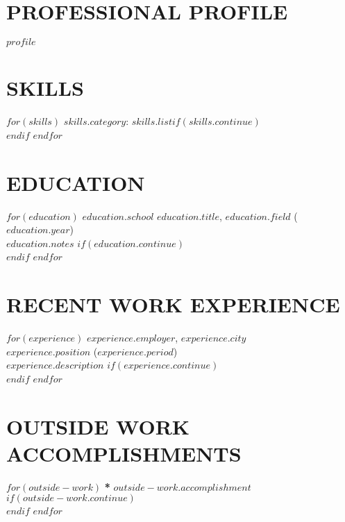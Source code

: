\documentclass[a4paper, line, 11pt]{res} %
\begin{document}
 
 
\address{$if(contact.address)$$contact.address$\\$endif$$if(contact.telephone)$Tel: $contact.telephone$$endif$}        
\address{$if(contact.email)$E-mail: $contact.email$$endif$$if(contact.url)$\\ URL: $contact.url$$endif$$if(contact.extra)$$contact.extra$$endif$}
  
                        
\begin{resume}                         
 
\section{PROFESSIONAL PROFILE}  
  $profile$ 

\section{SKILLS}  

$for(skills)$
    \textbf{$skills.category$}: $skills.list$$if(skills.continue)$\\$endif$
$endfor$

\section{EDUCATION} 

$for(education)$
    \textbf{\uppercase{$education.school$}} \emph{$education.title$}, $education.field$ ($education.year$)\\ $education.notes$ $if(education.continue)$\\$endif$
$endfor$

  

\section{RECENT WORK EXPERIENCE}
$for(experience)$
    \textbf{\uppercase{$experience.employer$}}, $experience.city$ \\ \emph{$experience.position$} ($experience.period$)\\ $experience.description$ $if(experience.continue)$\\$endif$
$endfor$


\section{OUTSIDE WORK ACCOMPLISHMENTS}  

$for(outside-work)$
\textbf{*} $outside-work.accomplishment$$if(outside-work.continue)$\\$endif$
$endfor$
\end{resume}
\end{document}
